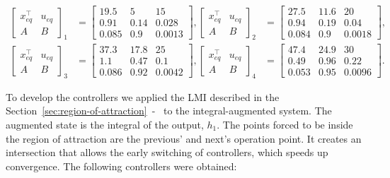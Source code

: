 \begin{align*}
  \label{eq:op-points}
  \left[\begin{array}{c|c}
      x_{eq}^{\top} & u_{eq} \\
      \hline
      A             & B
    \end{array}\right]_{1} & = \left[\begin{array}{cc|c}
      19.5  & 5    & 15     \\
      \hline
      0.91  & 0.14 & 0.028  \\
      0.085 & 0.9  & 0.0013
    \end{array}\right],
  \left[\begin{array}{c|c}
      x_{eq}^{\top} & u_{eq} \\
      \hline
      A             & B
    \end{array}\right]_{2} & = \left[\begin{array}{cc|c}
      27.5  & 11.6 & 20     \\
      \hline
      0.94  & 0.19 & 0.04   \\
      0.084 & 0.9  & 0.0018
    \end{array}\right], \\
  \left[\begin{array}{c|c}
      x_{eq}^{\top} & u_{eq} \\
      \hline
      A             & B
    \end{array}\right]_{3} & = \left[\begin{array}{cc|c}
      37.3  & 17.8 & 25     \\
      \hline
      1.1   & 0.47 & 0.1    \\
      0.086 & 0.92 & 0.0042
    \end{array}\right],
  \left[\begin{array}{c|c}
      x_{eq}^{\top} & u_{eq} \\
      \hline
      A             & B
    \end{array}\right]_{4} & = \left[\begin{array}{cc|c}
      47.4  & 24.9 & 30     \\
      \hline
      0.49  & 0.96 & 0.22   \\
      0.053 & 0.95 & 0.0096
    \end{array}\right].
\end{align*}

To develop the controllers we applied the LMI described in the
Section~\ref{sec:region-of-attraction}~-~ to
the integral-augmented system. The augmented state is the integral of the
output, \(h_{1}\). The points forced to be inside the region of attraction are
the previous' and next's operation point. It creates an intersection that allows
the early switching of controllers, which speeds up convergence. The following
controllers were obtained:

